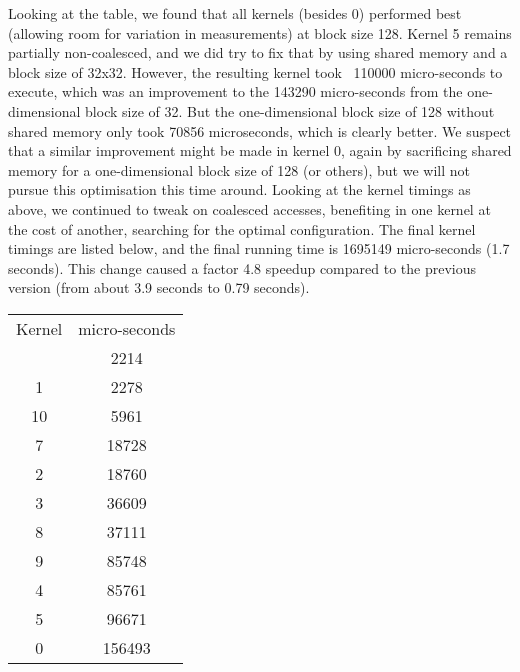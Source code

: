 Looking at the table, we found that all kernels (besides 0) performed best (allowing room for variation in measurements) at block size 128.\n
Kernel 5 remains partially non-coalesced, and we did try to fix that by using shared memory and a block size of 32x32. However, the resulting kernel took ~110000 micro-seconds to execute, which was an improvement to the 143290 micro-seconds from the one-dimensional block size of 32. But the one-dimensional block size of 128 without shared memory only took 70856 microseconds, which is clearly better.\n
We suspect that a similar improvement might be made in kernel 0, again by sacrificing shared memory for a one-dimensional block size of 128 (or others), but we will not pursue this optimisation this time around.\n
Looking at the kernel timings as above, we continued to tweak on coalesced accesses, benefiting in one kernel at the cost of another, searching for the optimal configuration.\n
The final kernel timings are listed below, and the final running time is 1695149 micro-seconds (1.7 seconds).\n
This change caused a factor 4.8 speedup compared to the previous version
(from about 3.9 seconds to 0.79 seconds).


\begin{tabular}{c | c}
Kernel & micro-seconds \\
\vline
6  & 2214 \\
1  & 2278 \\
10 & 5961 \\
7  & 18728 \\
2  & 18760 \\
3  & 36609 \\
8  & 37111 \\
9  & 85748 \\
4  & 85761 \\
5  & 96671 \\
0  & 156493
\end{tabular}


